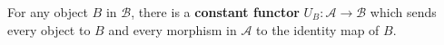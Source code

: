 For any object $B$ in $\mathcal{B}$, there is a \textbf{constant functor} $U_B: \mathcal{A} \to \mathcal{B}$ which sends every object to $B$ and every morphism in $\mathcal{A}$ to the identity map of $B$.
